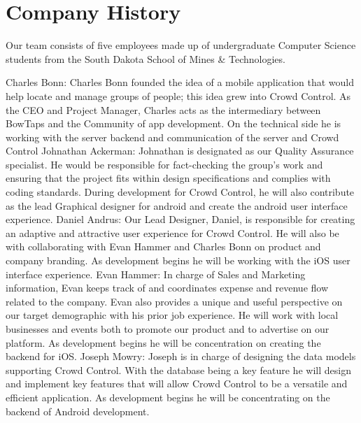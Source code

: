 \section{Company History}

Our team consists of five employees made up of undergraduate Computer Science students from the South Dakota School of Mines & Technologies. 

Charles Bonn: Charles Bonn founded the idea of a mobile application that would help locate and manage groups of people; this idea grew into Crowd Control. As the CEO and Project Manager, Charles acts as the intermediary between BowTaps and the Community of app development. On the technical side he is working with the server backend and communication of the server and Crowd Control 
Johnathan Ackerman: Johnathan is designated as our Quality Assurance specialist. He would be responsible for fact-checking the group’s work and ensuring that the project fits within design specifications and complies with coding standards. During development for Crowd Control, he will also contribute as the lead Graphical designer for android and create the android user interface experience.
Daniel Andrus: 
Our Lead Designer, Daniel, is responsible for creating an adaptive and attractive user experience for Crowd Control. He will also be with collaborating with Evan Hammer and Charles Bonn on product and company branding. As development begins he will be working with the iOS user interface experience.
Evan Hammer: In charge of Sales and Marketing information, Evan keeps track of and coordinates expense and revenue flow related to the company. Evan also provides a unique and useful perspective on our target demographic with his prior job experience. He will work with local businesses and events both to promote our product and to advertise on our platform. As development begins he will be concentration on creating the backend for iOS. 
Joseph Mowry: Joseph is in charge of designing the data models supporting Crowd Control. With the database being a key feature he will design and implement key features that will allow Crowd Control to be a versatile and efficient application. As development begins he will be concentrating on the backend of Android development.






